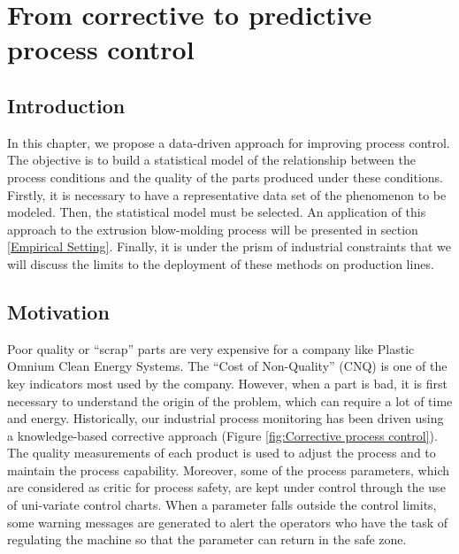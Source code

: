 \chapter{From corrective to predictive process control} \label{From Corrective to Predictive Process Control}
\minitoc

\section{Introduction}

In this chapter, we propose a data-driven approach for improving process control. The objective is to build a statistical model of the relationship between the process conditions and the  quality of the parts produced under these conditions. Firstly, it is necessary to have a representative data set of the phenomenon to be modeled. Then, the statistical model must be selected. An application of this approach to the extrusion blow-molding process will be presented in section \ref{Empirical Setting}. Finally, it is under the prism of industrial constraints that we will discuss the limits to the deployment of these methods on production lines.


\section{Motivation}

Poor quality or ``scrap'' parts are very expensive for a company like Plastic Omnium Clean Energy Systems. The “Cost of Non-Quality” (CNQ) is one of the key indicators most used by the company. However, when a part is bad, it is first necessary to understand the origin of the problem, which can require a lot of time and energy. Historically, our industrial process monitoring has been driven using a knowledge-based corrective approach (Figure \ref{fig:Corrective process control}). The quality measurements of each product is used to adjust the process and to maintain the process capability. Moreover, some of the process parameters, which are considered as critic for process safety, are kept under control through the use of uni-variate control charts.  When a parameter falls outside the control limits, some warning messages are generated to alert the operators who have the task of regulating the machine so that the parameter can return in the safe zone. 

